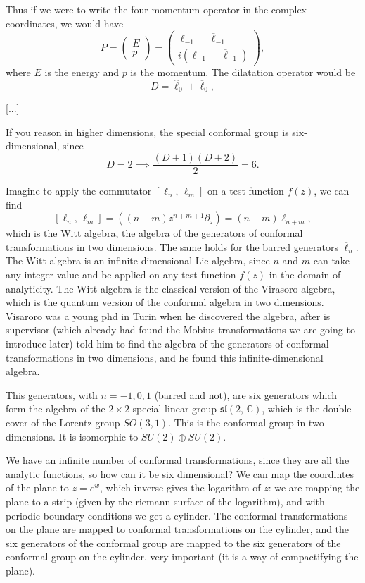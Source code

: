 Thus if we were to write the four momentum operator in the complex coordinates, we would have
\[
    P = \begin{pmatrix}
        E \\
        p
    \end{pmatrix} = \begin{pmatrix}
        \ell_{-1} + \overline{\ell}_{-1} \\
        i(\ell_{-1} - \overline{\ell}_{-1})
    \end{pmatrix},
\]
where \(E\) is the energy and \(p\) is the momentum. The dilatation operator would be
\[
    D = \hat{\ell}_0 + \overline{\ell}_0,
\]

[...]

If you reason in higher dimensions, the special conformal group is six-dimensional, since
\[
    D=2 \implies \frac{(D+1)(D+2)}{2} = 6.
\]

Imagine to apply the commutator \(\left[ \ell_n, \, \ell_m \right]\) on a test function \(f(z)\), we can find
\[
    \left[ \ell_n, \, \ell_m \right] = \left( (n - m) z^{n + m + 1} \partial_z \right) = (n - m) \ell_{n + m},
\]
which is the Witt algebra, the algebra of the generators of conformal transformations in two dimensions. The same holds for the barred generators \(\overline{\ell}_n\). The Witt algebra is an infinite-dimensional Lie algebra, since \(n\) and \(m\) can take any integer value and be applied on any test function \(f(z)\) in the domain of analyticity. The Witt algebra is the classical version of the Virasoro algebra, which is the quantum version of the conformal algebra in two dimensions. Visaroro was a young phd in Turin when he discovered the algebra, after is supervisor (which already had found the Mobius transformations we are going to introduce later) told him to find the algebra of the generators of conformal transformations in two dimensions, and he found this infinite-dimensional algebra.

This generators, with \(n = -1,0,1\) (barred and not), are six generators which form the algebra of the \(2\times 2\) special linear group \(\mathfrak{sl}(2, \, \mathbb{C})\), which is the double cover of the Lorentz group \(SO(3,1)\). This is the conformal group in two dimensions. It is isomorphic to \(SU(2)\oplus SU(2)\).

We have an infinite number of conformal transformations, since they are all the analytic functions, so how can it be six dimensional? We can map the coordintes of the plane to \(z=e^{w}\), which inverse gives the logarithm of \(z\): we are mapping the plane to a strip (given by the riemann surface of the logarithm), and with periodic boundary conditions we get a cylinder. The conformal transformations on the plane are mapped to conformal transformations on the cylinder, and the six generators of the conformal group are mapped to the six generators of the conformal group on the cylinder. very important (it is a way of compactifying the plane).

